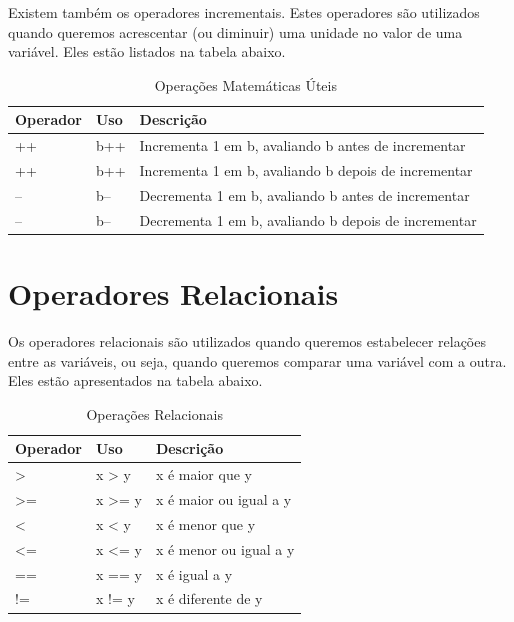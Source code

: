 \documentclass[
]{book}
\begin{document}
Existem também os operadores incrementais. Estes operadores são utilizados quando queremos acrescentar (ou diminuir) uma unidade no valor de uma variável. Eles estão listados na tabela abaixo.

\begin{table}

\caption{\label{tab:unnamed-chunk-5}Operações Matemáticas Úteis}
\centering
\begin{tabular}[t]{l|l|l}
\hline
Operador & Uso & Descrição\\
\hline
++ & b++ & Incrementa 1 em b, avaliando b antes de incrementar\\
\hline
++ & b++ & Incrementa 1 em b, avaliando b depois de incrementar\\
\hline
-- & b-- & Decrementa 1 em b, avaliando b antes de incrementar\\
\hline
-- & b-- & Decrementa 1 em b, avaliando b depois de incrementar\\
\hline
\end{tabular}
\end{table}

\hypertarget{operadores-relacionais}{%
\section{Operadores Relacionais}\label{operadores-relacionais}}

Os operadores relacionais são utilizados quando queremos estabelecer relações entre as variáveis, ou seja, quando queremos comparar uma variável com a outra. Eles estão apresentados na tabela abaixo.

\begin{table}

\caption{\label{tab:unnamed-chunk-6}Operações Relacionais}
\centering
\begin{tabular}[t]{l|l|l}
\hline
Operador & Uso & Descrição\\
\hline
> & x > y & x é maior que y\\
\hline
>= & x >= y & x é maior ou igual a y\\
\hline
< & x < y & x é menor que y\\
\hline
<= & x <= y & x é menor ou igual a y\\
\hline
== & x == y & x é igual a y\\
\hline
!= & x != y & x é diferente de y\\
\hline
\end{tabular}
\end{table}
\end{document}
